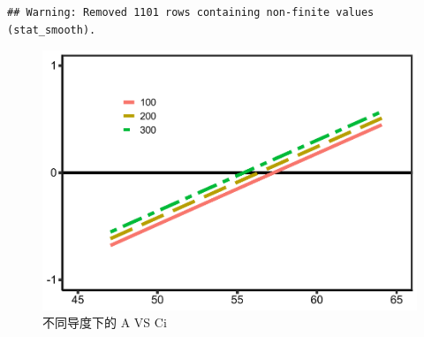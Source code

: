 \documentclass[
]{krantz}
\begin{document}
\begin{verbatim}
## Warning: Removed 1101 rows containing non-finite values (stat_smooth).
\end{verbatim}

\begin{figure}
\centering
\includegraphics{bookdown_files/figure-latex/high3tplot-1.pdf}
\caption{\label{fig:high3tplot}不同导度下的 A VS Ci}
\end{figure}
\end{document}
